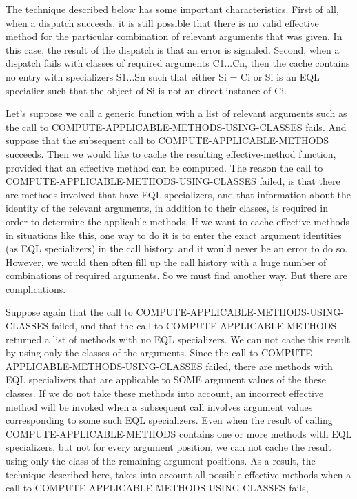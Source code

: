 The technique described below has some important characteristics.
First of all, when a dispatch succeeds, it is still possible that
there is no valid effective method for the particular combination of
relevant arguments that was given.  In this case, the result of the
dispatch is that an error is signaled.  Second, when a dispatch fails
with classes of required arguments C1...Cn, then the cache contains no
entry with specializers S1...Sn such that either Si = Ci or Si is an
EQL specialier such that the object of Si is not an direct instance of
Ci.

Let's suppose we call a generic function with a list of relevant
arguments such as the call to COMPUTE-APPLICABLE-METHODS-USING-CLASSES
fails.  And suppose that the subsequent call to
COMPUTE-APPLICABLE-METHODS succeeds.  Then we would like to cache the
resulting effective-method function, provided that an effective method
can be computed.  The reason the call to
COMPUTE-APPLICABLE-METHODS-USING-CLASSES failed, is that there are
methods involved that have EQL specializers, and that information
about the identity of the relevant arguments, in addition to their
classes, is required in order to determine the applicable methods.  If
we want to cache effective methods in situations like this, one way to
do it is to enter the exact argument identities (as EQL specializers)
in the call history, and it would never be an error to do so.
However, we would then often fill up the call history with a huge
number of combinations of required arguments.  So we must find another
way.  But there are complications.

Suppose again that the call to
COMPUTE-APPLICABLE-METHODS-USING-CLASSES failed, and that the call to
COMPUTE-APPLICABLE-METHODS returned a list of methods with no EQL
specializers.  We can not cache this result by using only the classes
of the arguments.  Since the call to
COMPUTE-APPLICABLE-METHODS-USING-CLASSES failed, there are methods
with EQL specializers that are applicable to SOME argument values of
the these classes.  If we do not take these methods into account, an
incorrect effective method will be invoked when a subsequent call
involves argument values corresponding to some such EQL specializers.
Even when the result of calling COMPUTE-APPLICABLE-METHODS contains
one or more methods with EQL specializers, but not for every argument
position, we can not cache the result using only the class of the
remaining argument positions.  As a result, the technique described
here, takes into account all possible effective methods when a call to
COMPUTE-APPLICABLE-METHODS-USING-CLASSES fails,

